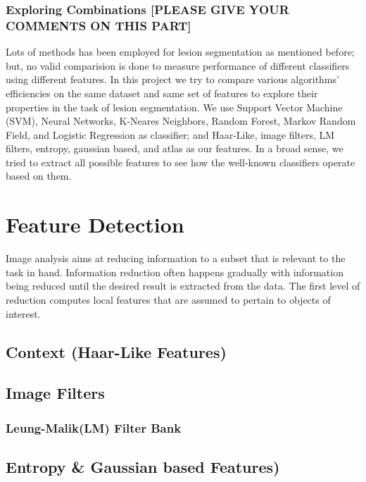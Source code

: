 \documentclass{article} %
\begin{document}
\subsubsection{ Exploring Combinations [PLEASE GIVE YOUR COMMENTS ON THIS PART] }
Lots of methods has been employed for lesion segmentation as mentioned before; but, no valid comparision is done to measure performance of different classifiers using different features. In this project we try to compare various algorithms' efficiencies on the same dataset and same set of features to explore their properties in the task of lesion segmentation. We use Support Vector Machine (SVM), Neural Networks, K-Neares Neighbors, Random Forest, Markov Random Field, and Logistic Regression as classifier; and Haar-Like, image filters, LM filters, entropy, gaussian based, and atlas as our features. In a broad sense, we tried to extract all possible features to see how the well-known classifiers operate based on them.

\section{Feature Detection}
Image analysis aims at reducing information to a subset that is relevant to the task in hand. Information reduction often happens gradually with information being reduced until the desired result is extracted from the data. \cite{toennies2012guide} The first level of reduction computes local features that
are assumed to pertain to objects of interest. 
\subsection{Context (Haar-Like Features)}

\subsection{Image Filters}

\subsubsection{Leung-Malik(LM) Filter Bank}

\subsection{Entropy \& Gaussian based Features)}
\end{document}

